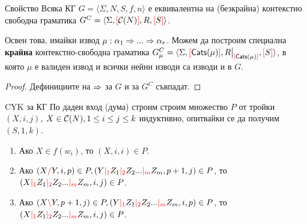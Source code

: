 \documentclass[9pt]{beamer}
\begin{document}
  \begin{frame}{Свойство}
    Всяка КГ $G = \langle \Sigma, N, S, f, n \rangle$ е еквивалентна на
    (безкрайна) контекстно свободна граматика
    $G^C = \langle \Sigma, \textcolor{red}{[} \mathcal{C}( N ) \textcolor{red}{]}, R, \textcolor{red}{[} S \textcolor{red}{]} \rangle$.

    Освен това, имайки извод $\mu: \alpha_1 \Rightarrow ... \Rightarrow \alpha_r$.
    Можем да построим специална \textbf{крайна} контекстно-свободна граматика
    $G_\mu^C = \langle \Sigma, \lb \catsin{\mu} \rb, \restr{R}{\lb \catsin{\mu} \rb}, \lb S \rb \rangle$,
    в която $\mu$ е валиден извод и всички нейни изводи са изводи и в $G$.

    \begin{proof}
        Дефинициите на $\Rightarrow$ за $G$ и за $G^C$ съвпадат.
    \end{proof}
  \end{frame}

  \begin{frame}{CYK за КГ}
    По даден вход (дума) строим строим множество $P$ от тройки
    $(X, i, j)$, $X \in \mathcal{C}( N ), 1 \leq i \leq j \leq k$ индуктивно,
    опитвайки се да получим
    $(S, 1, k)$.

    \begin{enumerate}
    \label{cyk:rules}
        \item Ако $X \in f(w_i)$, то $(X, i, i) \in P$.
        \item Ако $(X \textcolor{red}{/} Y, i, p) \in P, (Y \textcolor{red}{|_{1}} Z_1 \textcolor{red}{|_{2}} Z_2 ... \textcolor{red}{|_{m}} Z_m, p + 1, j) \in P$,
            то $(X \textcolor{red}{|_{1}} Z_1 \textcolor{red}{|_{2}} Z_2 ... \textcolor{red}{|_{m}} Z_m, i, j) \in P$.
        \item Ако $(X \textcolor{red}{\backslash} Y, p + 1, j) \in P, (Y \textcolor{red}{|_{1}} Z_1 \textcolor{red}{|_{2}} Z_2 ... \textcolor{red}{|_{m}} Z_m, i, p) \in P$,
            то $(X \textcolor{red}{|_{1}} Z_1 \textcolor{red}{|_{2}} Z_2 ... \textcolor{red}{|_{m}} Z_m, i, j) \in P$.
    \end{enumerate}
  \end{frame}
\end{document}
